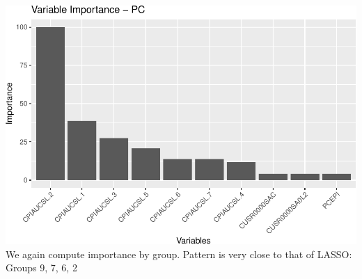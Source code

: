 \documentclass[
]{article}
\begin{document}
\includegraphics{Trabalho_Econo4_Q2_files/figure-latex/unnamed-chunk-35-1.pdf}
We again compute importance by group. Pattern is very close to that of
LASSO: Groups 9, 7, 6, 2
\end{document}
